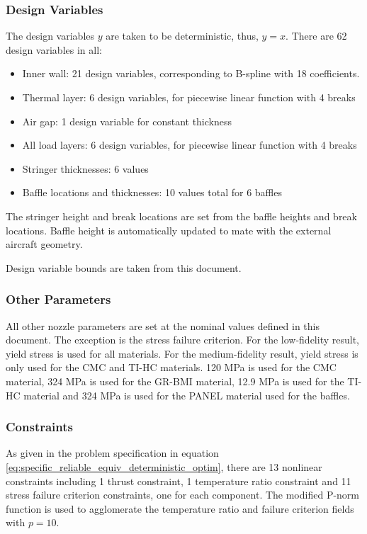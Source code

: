 \documentclass{article}
\begin{document}
\subsubsection{Design Variables}
The design variables $y$ are taken to be deterministic, thus, $y = x$. There are 62 design variables in all:

\begin{itemize}
\item Inner wall: 21 design variables, corresponding to B-spline with 18 coefficients.
\item Thermal layer: 6 design variables, for piecewise linear function with 4 breaks
\item Air gap: 1 design variable for constant thickness
\item All load layers: 6 design variables, for piecewise linear function with 4 breaks
\item Stringer thicknesses: 6 values
\item Baffle locations and thicknesses: 10 values total for 6 baffles
\end{itemize}

The stringer height and break locations are set from the baffle heights and break locations. Baffle height is automatically updated to mate with the external aircraft geometry.

Design variable bounds are taken from this document.

\subsubsection{Other Parameters}

All other nozzle parameters are set at the nominal values defined in this document. The exception is the stress failure criterion. For the low-fidelity result, yield stress is used for all materials. For the medium-fidelity result, yield stress is only used for the CMC and TI-HC materials. 120 MPa is used for the CMC material, 324 MPa is used for the GR-BMI material, 12.9 MPa is used for the TI-HC material and 324 MPa is used for the PANEL material used for the baffles.

\subsubsection{Constraints}

As given in the problem specification in equation \ref{eq:specific_reliable_equiv_deterministic_optim}, there are 13 nonlinear constraints including 1 thrust constraint, 1 temperature ratio constraint and 11 stress failure criterion constraints, one for each component. The modified P-norm function is used to agglomerate the temperature ratio and failure criterion fields with $p = 10$.
\end{document}
